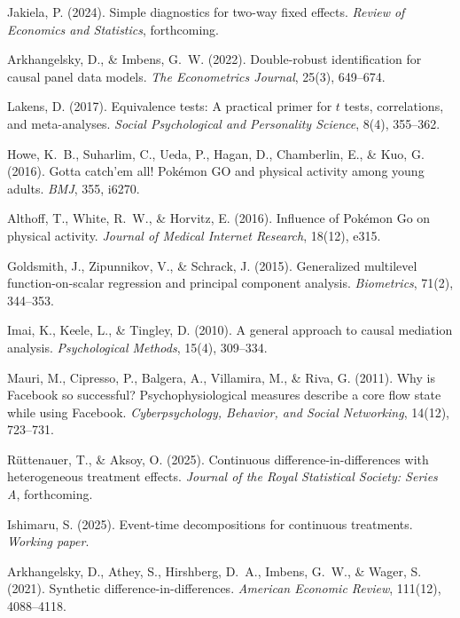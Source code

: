 \documentclass[a4paper,11pt,titlepage]{article}
\begin{document}
\begin{enumerate}[label={[\arabic*]}, leftmargin=2em, itemsep=2pt]
  \item Jakiela, P. (2024). Simple diagnostics for two-way fixed effects. \textit{Review of Economics and Statistics}, forthcoming.
  \item Arkhangelsky, D., \& Imbens, G.~W. (2022). Double-robust identification for causal panel data models. \textit{The Econometrics Journal}, 25(3), 649--674.
  \item Lakens, D. (2017). Equivalence tests: A practical primer for $t$ tests, correlations, and meta-analyses. \textit{Social Psychological and Personality Science}, 8(4), 355--362.
  \item Howe, K.~B., Suharlim, C., Ueda, P., Hagan, D., Chamberlin, E., \& Kuo, G. (2016). Gotta catch'em all! Pok\'emon GO and physical activity among young adults. \textit{BMJ}, 355, i6270.
  \item Althoff, T., White, R.~W., \& Horvitz, E. (2016). Influence of Pok\'emon Go on physical activity. \textit{Journal of Medical Internet Research}, 18(12), e315.
  \item Goldsmith, J., Zipunnikov, V., \& Schrack, J. (2015). Generalized multilevel function-on-scalar regression and principal component analysis. \textit{Biometrics}, 71(2), 344--353.
  \item Imai, K., Keele, L., \& Tingley, D. (2010). A general approach to causal mediation analysis. \textit{Psychological Methods}, 15(4), 309--334.
  \item Mauri, M., Cipresso, P., Balgera, A., Villamira, M., \& Riva, G. (2011). Why is Facebook so successful? Psychophysiological measures describe a core flow state while using Facebook. \textit{Cyberpsychology, Behavior, and Social Networking}, 14(12), 723--731.
  \item R\"uttenauer, T., \& Aksoy, O. (2025). Continuous difference-in-differences with heterogeneous treatment effects. \textit{Journal of the Royal Statistical Society: Series A}, forthcoming.
  \item Ishimaru, S. (2025). Event-time decompositions for continuous treatments. \textit{Working paper}.
  \item Arkhangelsky, D., Athey, S., Hirshberg, D.~A., Imbens, G.~W., \& Wager, S. (2021). Synthetic difference-in-differences. \textit{American Economic Review}, 111(12), 4088--4118.
\end{enumerate}


\end{document}
